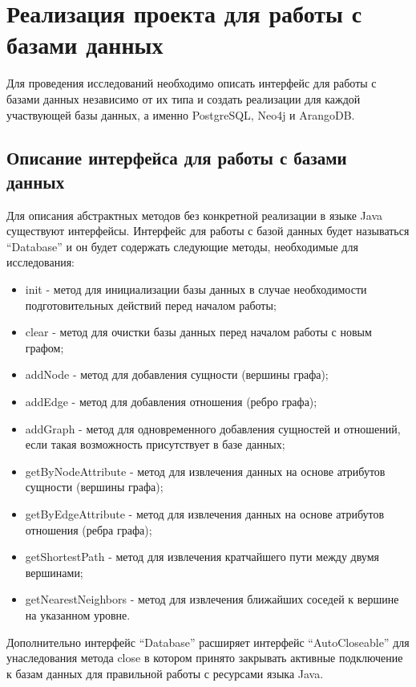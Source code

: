 \chapter{Реализация проекта для работы с базами данных}

Для проведения исследований необходимо описать интерфейс для работы с базами данных независимо от их типа и создать реализации для каждой
участвующей базы данных, а именно PostgreSQL, Neo4j и ArangoDB.


\section{Описание интерфейса для работы с базами данных}

Для описания абстрактных методов без конкретной реализации в языке Java существуют интерфейсы. Интерфейс для работы с базой данных будет
называться “Database” и он будет содержать следующие методы, необходимые для исследования:

\begin{itemize}
    \item init - метод для инициализации базы данных в случае необходимости подготовительных действий перед началом работы;
    \item clear - метод для очистки базы данных перед началом работы с новым графом;
    \item addNode - метод для добавления сущности (вершины графа);
    \item addEdge - метод для добавления отношения (ребро графа);
    \item addGraph - метод для одновременного добавления сущностей и отношений, если такая возможность присутствует в базе данных;
    \item getByNodeAttribute - метод для извлечения данных на основе атрибутов сущности (вершины графа);
    \item getByEdgeAttribute - метод для извлечения данных на основе атрибутов отношения (ребра графа);
    \item getShortestPath - метод для извлечения кратчайшего пути между двумя вершинами;
    \item getNearestNeighbors - метод для извлечения ближайших соседей к вершине на указанном уровне.
\end{itemize}

Дополнительно интерфейс “Database” расширяет интерфейс “AutoCloseable” для унаследования метода close в котором принято закрывать активные
подключение к базам данных для правильной работы с ресурсами языка Java.


